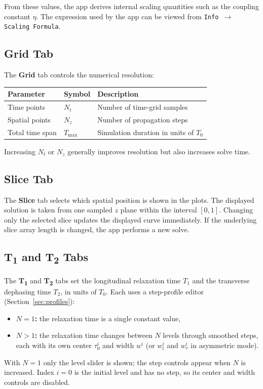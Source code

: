 \documentclass[12pt,a4paper]{article}
\newcommand{\tab}[1]{\textbf{#1}}
\newcommand{\menu}[1]{\texttt{#1}}
\begin{document}
From these values, the app derives internal scaling quantities such as the coupling constant $\eta$.
The expression used by the app can be viewed from \menu{Info $\to$ Scaling Formula}.

\subsection{Grid Tab}

The \tab{Grid} tab controls the numerical resolution:
\begin{center}
\begin{tabular}{@{}lll@{}}
  \toprule
  Parameter & Symbol & Description \\
  \midrule
  Time points & $N_t$ & Number of time-grid samples \\
  Spatial points & $N_z$ & Number of propagation steps \\
  Total time span & $T_{\max}$ & Simulation duration in units of $T_0$ \\
  \bottomrule
\end{tabular}
\end{center}

Increasing $N_t$ or $N_z$ generally improves resolution but also increases solve time.

\subsection{Slice Tab}

The \tab{Slice} tab selects which spatial position is shown in the plots.
The displayed solution is taken from one sampled $z$ plane within the interval $[0,1]$.
Changing only the selected slice updates the displayed curve immediately. If the underlying slice array
length is changed, the app performs a new solve.

\subsection{T\textsubscript{1} and T\textsubscript{2} Tabs}

The \tab{T\textsubscript{1}} and \tab{T\textsubscript{2}} tabs set the
longitudinal relaxation time $T_1$ and the transverse dephasing time $T_2$,
in units of $T_0$. Each uses a step-profile editor
(Section~\ref{sec:profiles}):
\begin{itemize}[noitemsep]
  \item \textbf{$N = 1$:} the relaxation time is a single constant value,
  \item \textbf{$N > 1$:} the relaxation time changes between $N$ levels
  through smoothed steps, each with its own center $\tau_0^i$ and width $w^i$
  (or $w_l^i$ and $w_r^i$ in asymmetric mode).
\end{itemize}
With $N = 1$ only the level slider is shown; the step controls appear when
$N$ is increased. Index $i = 0$ is the initial level and has no step, so
its center and width controls are disabled.
\end{document}
